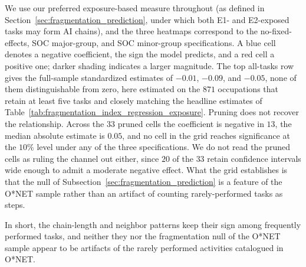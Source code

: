 We use our preferred exposure-based measure throughout (as defined in Section~\ref{sec:fragmentation_prediction}, under which both E1- and E2-exposed tasks may form AI chains), and the three heatmaps correspond to the no-fixed-effects, SOC major-group, and SOC minor-group specifications.
A blue cell denotes a negative coefficient, the sign the model predicts, and a red cell a positive one; darker shading indicates a larger magnitude.
The top all-tasks row gives the full-sample standardized estimates of $-0.01$, $-0.09$, and $-0.05$, none of them distinguishable from zero, here estimated on the $871$ occupations that retain at least five tasks and closely matching the headline estimates of Table~\ref{tab:fragmentation_index_regression_exposure}.
Pruning does not recover the relationship.
Across the $33$ pruned cells the coefficient is negative in $13$, the median absolute estimate is $0.05$, and no cell in the grid reaches significance at the $10\%$ level under any of the three specifications.
We do not read the pruned cells as ruling the channel out either, since $20$ of the $33$ retain confidence intervals wide enough to admit a moderate negative effect.
What the grid establishes is that the null of Subsection~\ref{sec:fragmentation_prediction} is a feature of the O*NET sample rather than an artifact of counting rarely-performed tasks as steps.



In short, the chain-length and neighbor patterns keep their sign among frequently performed tasks, and neither they nor the fragmentation null of the O*NET sample appear to be artifacts of the rarely performed activities catalogued in O*NET.